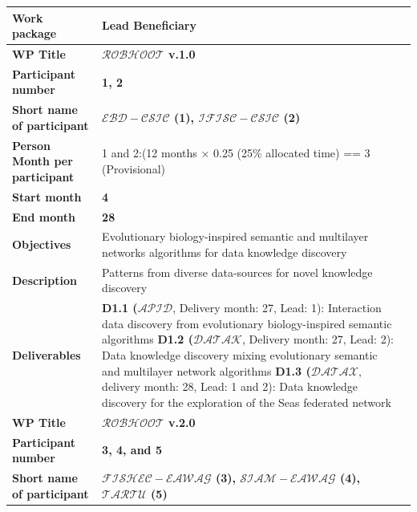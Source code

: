 \documentclass[11pt, a4paper]{article} %
\begin{document}
\begin{table}[h!]
\begin{center}
  {\footnotesize \begin{tabular}{|m{3cm} || m{12cm} || m{1cm}|}
    \hline\hline\hline
    \rowcolor{lightpink!30}
    {\bf Work package} & {\bf Lead Beneficiary} & \\
    \hline
    \rowcolor{piggypink!20}
    {\bf WP Title} & {\bf $\mathcal{ROBHOOT}$ v.1.0} &  \\
    \hline
    \rowcolor{piggypink!20}
    {\bf Participant number} & {\bf 1, 2} & \\
    \hline
    \rowcolor{piggypink!20}
    {\bf Short name of participant} & {\bf $\mathcal{EBD-CSIC}$ (1), $\mathcal{IFISC-CSIC}$ (2)} & \\
    \hline
    \rowcolor{piggypink!20}
    {\bf Person Month per participant} & 1 and 2:(12 months $\times$ 0.25 (25\% allocated time) == 3 (Provisional) & \\
    \hline
    \rowcolor{piggypink!20}
    {\bf Start month} & {\bf 4} & \\
    \hline
    \rowcolor{piggypink!20}
    {\bf End month} & {\bf 28} & \\
    \hline
    \rowcolor{piggypink!20}
    {\bf Objectives} & Evolutionary biology-inspired semantic and multilayer networks algorithms for data knowledge discovery & \\
    \hline
    \rowcolor{piggypink!20}
    {\bf Description} & Patterns from diverse data-sources for novel knowledge discovery & \\
    \hline
    \rowcolor{piggypink!20}
    {\bf Deliverables} & {\bf D1.1 ($\mathcal{APID}$}, Delivery month: 27, Lead: 1): Interaction data discovery from evolutionary biology-inspired semantic algorithms
                         {\bf D1.2 ($\mathcal{DATAK}$}, Delivery month: 27, Lead: 2): Data knowledge discovery mixing evolutionary semantic and multilayer network algorithms
                          {\bf D1.3 ($\mathcal{DATAX}$}, delivery month: 28, Lead: 1 and 2): Data knowledge discovery for the exploration of the Seas federated network & \\
    \hline\hline\hline
    \rowcolor{piggypink!20}
    {\bf WP Title} & {\bf $\mathcal{ROBHOOT}$ v.2.0} &  \\
    \hline
    \rowcolor{piggypink!20}
    {\bf Participant number} & {\bf 3, 4, and 5} & \\
    \hline
    \rowcolor{piggypink!20}
    {\bf Short name of participant} & {\bf $\mathcal{FISHEC-EAWAG}$ (3), $\mathcal{SIAM-EAWAG}$ (4), $\mathcal{TARTU}$ (5)} & \\

\end{tabular}}
\end{center}
\end{table}
\end{document}
